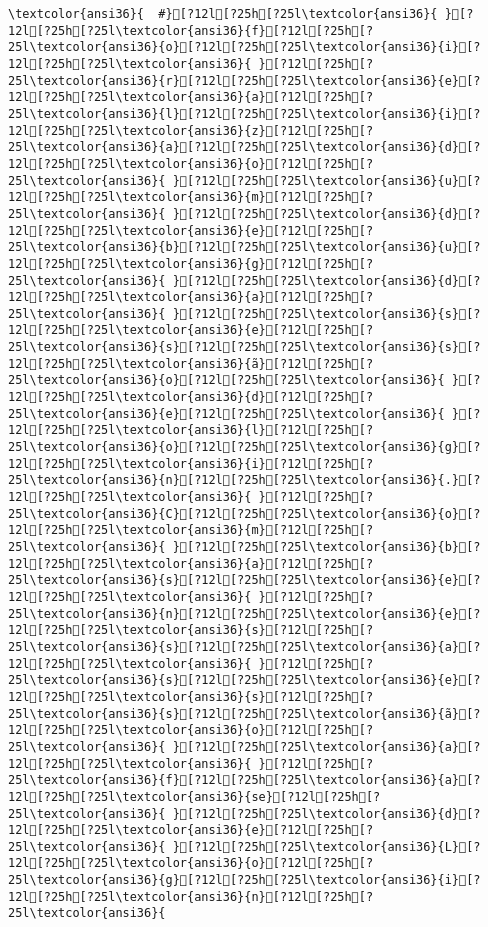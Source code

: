 \documentclass{scrartcl}
\begin{document}
\begin{Verbatim}
\textcolor{ansi36}{  #}[?12l[?25h[?25l\textcolor{ansi36}{ }[?12l[?25h[?25l\textcolor{ansi36}{f}[?12l[?25h[?25l\textcolor{ansi36}{o}[?12l[?25h[?25l\textcolor{ansi36}{i}[?12l[?25h[?25l\textcolor{ansi36}{ }[?12l[?25h[?25l\textcolor{ansi36}{r}[?12l[?25h[?25l\textcolor{ansi36}{e}[?12l[?25h[?25l\textcolor{ansi36}{a}[?12l[?25h[?25l\textcolor{ansi36}{l}[?12l[?25h[?25l\textcolor{ansi36}{i}[?12l[?25h[?25l\textcolor{ansi36}{z}[?12l[?25h[?25l\textcolor{ansi36}{a}[?12l[?25h[?25l\textcolor{ansi36}{d}[?12l[?25h[?25l\textcolor{ansi36}{o}[?12l[?25h[?25l\textcolor{ansi36}{ }[?12l[?25h[?25l\textcolor{ansi36}{u}[?12l[?25h[?25l\textcolor{ansi36}{m}[?12l[?25h[?25l\textcolor{ansi36}{ }[?12l[?25h[?25l\textcolor{ansi36}{d}[?12l[?25h[?25l\textcolor{ansi36}{e}[?12l[?25h[?25l\textcolor{ansi36}{b}[?12l[?25h[?25l\textcolor{ansi36}{u}[?12l[?25h[?25l\textcolor{ansi36}{g}[?12l[?25h[?25l\textcolor{ansi36}{ }[?12l[?25h[?25l\textcolor{ansi36}{d}[?12l[?25h[?25l\textcolor{ansi36}{a}[?12l[?25h[?25l\textcolor{ansi36}{ }[?12l[?25h[?25l\textcolor{ansi36}{s}[?12l[?25h[?25l\textcolor{ansi36}{e}[?12l[?25h[?25l\textcolor{ansi36}{s}[?12l[?25h[?25l\textcolor{ansi36}{s}[?12l[?25h[?25l\textcolor{ansi36}{ã}[?12l[?25h[?25l\textcolor{ansi36}{o}[?12l[?25h[?25l\textcolor{ansi36}{ }[?12l[?25h[?25l\textcolor{ansi36}{d}[?12l[?25h[?25l\textcolor{ansi36}{e}[?12l[?25h[?25l\textcolor{ansi36}{ }[?12l[?25h[?25l\textcolor{ansi36}{l}[?12l[?25h[?25l\textcolor{ansi36}{o}[?12l[?25h[?25l\textcolor{ansi36}{g}[?12l[?25h[?25l\textcolor{ansi36}{i}[?12l[?25h[?25l\textcolor{ansi36}{n}[?12l[?25h[?25l\textcolor{ansi36}{.}[?12l[?25h[?25l\textcolor{ansi36}{ }[?12l[?25h[?25l\textcolor{ansi36}{C}[?12l[?25h[?25l\textcolor{ansi36}{o}[?12l[?25h[?25l\textcolor{ansi36}{m}[?12l[?25h[?25l\textcolor{ansi36}{ }[?12l[?25h[?25l\textcolor{ansi36}{b}[?12l[?25h[?25l\textcolor{ansi36}{a}[?12l[?25h[?25l\textcolor{ansi36}{s}[?12l[?25h[?25l\textcolor{ansi36}{e}[?12l[?25h[?25l\textcolor{ansi36}{ }[?12l[?25h[?25l\textcolor{ansi36}{n}[?12l[?25h[?25l\textcolor{ansi36}{e}[?12l[?25h[?25l\textcolor{ansi36}{s}[?12l[?25h[?25l\textcolor{ansi36}{s}[?12l[?25h[?25l\textcolor{ansi36}{a}[?12l[?25h[?25l\textcolor{ansi36}{ }[?12l[?25h[?25l\textcolor{ansi36}{s}[?12l[?25h[?25l\textcolor{ansi36}{e}[?12l[?25h[?25l\textcolor{ansi36}{s}[?12l[?25h[?25l\textcolor{ansi36}{s}[?12l[?25h[?25l\textcolor{ansi36}{ã}[?12l[?25h[?25l\textcolor{ansi36}{o}[?12l[?25h[?25l\textcolor{ansi36}{ }[?12l[?25h[?25l\textcolor{ansi36}{a}[?12l[?25h[?25l\textcolor{ansi36}{ }[?12l[?25h[?25l\textcolor{ansi36}{f}[?12l[?25h[?25l\textcolor{ansi36}{a}[?12l[?25h[?25l\textcolor{ansi36}{se}[?12l[?25h[?25l\textcolor{ansi36}{ }[?12l[?25h[?25l\textcolor{ansi36}{d}[?12l[?25h[?25l\textcolor{ansi36}{e}[?12l[?25h[?25l\textcolor{ansi36}{ }[?12l[?25h[?25l\textcolor{ansi36}{L}[?12l[?25h[?25l\textcolor{ansi36}{o}[?12l[?25h[?25l\textcolor{ansi36}{g}[?12l[?25h[?25l\textcolor{ansi36}{i}[?12l[?25h[?25l\textcolor{ansi36}{n}[?12l[?25h[?25l\textcolor{ansi36}{ 
\end{Verbatim}
\end{document}
